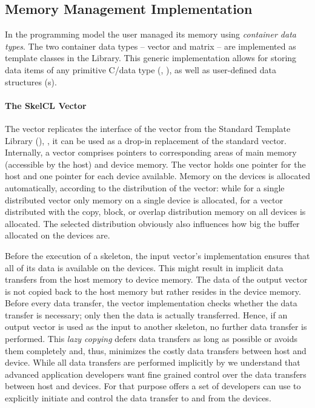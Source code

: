 \subsection{Memory Management Implementation}
\label{section:skelcl-library:memory-management}
In the \SkelCL programming model the user managed its memory using \emph{container data types}.
The two container data types -- vector and matrix -- are implemented as template classes in the \SkelCL Library.
This generic implementation allows for storing data items of any primitive C/\Cpp data type (\eg, ), as well as user-defined data structures (s).

\paragraph{The SkelCL Vector}
The \SkelCL vector replicates the interface of the vector from the Standard Template Library (\STL), \ie, it can be used as a drop-in replacement of the standard vector.
Internally, a vector comprises pointers to corresponding areas of main memory (accessible by the host) and device memory.
The vector holds one pointer for the host and one pointer for each device available.
Memory on the devices is allocated automatically, according to the distribution of the vector:
while for a single distributed vector only memory on a single device is allocated, for a vector distributed with the copy, block, or overlap distribution memory on all devices is allocated.
The selected distribution obviously also influences how big the buffer allocated on the devices are.

Before the execution of a skeleton, the input vector's implementation ensures that all of its data is available on the devices.
This might result in implicit data transfers from the host memory to device memory.
The data of the output vector is not copied back to the host memory but rather resides in the device memory.
Before every data transfer, the vector implementation checks whether the data transfer is necessary;
only then the data is actually transferred.
Hence, if an output vector is used as the input to another skeleton, no further data transfer is performed.
This \emph{lazy copying} defers data transfers as long as possible or avoids them completely and, thus, minimizes the costly data transfers between host and device.
While all data transfers are performed implicitly by \SkelCL we understand that advanced application developers want fine grained control over the data transfers between host and devices.
For that purpose \SkelCL offers a set of \APIs developers can use to explicitly initiate and control the data transfer to and from the devices.

